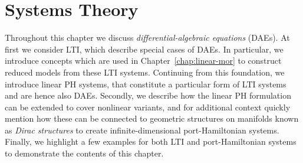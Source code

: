 \chapter{Systems Theory}\label{chap:systems-theory}

Throughout this chapter we discuss \emph{differential-algebraic equations} (DAEs).
At first we consider \acs{LTI}, which describe special cases of DAEs.
In particular, we introduce concepts which are used in Chapter~\ref{chap:linear-mor} to construct reduced models from these \ac{LTI} systems.
Continuing from this foundation, we introduce linear \ac{PH} systems, that constitute a particular form of \ac{LTI} systems and are hence also DAEs.
Secondly, we describe how the linear \ac{PH} formulation can be extended to cover nonlinear variants, and for additional context quickly mention how these can be connected to geometric structures on manifolds known as \emph{Dirac structures} to create infinite-dimensional port-Hamiltonian systems.
Finally, we highlight a few examples for both \ac{LTI} and port-Hamiltonian systems to demonstrate the contents of this chapter.




